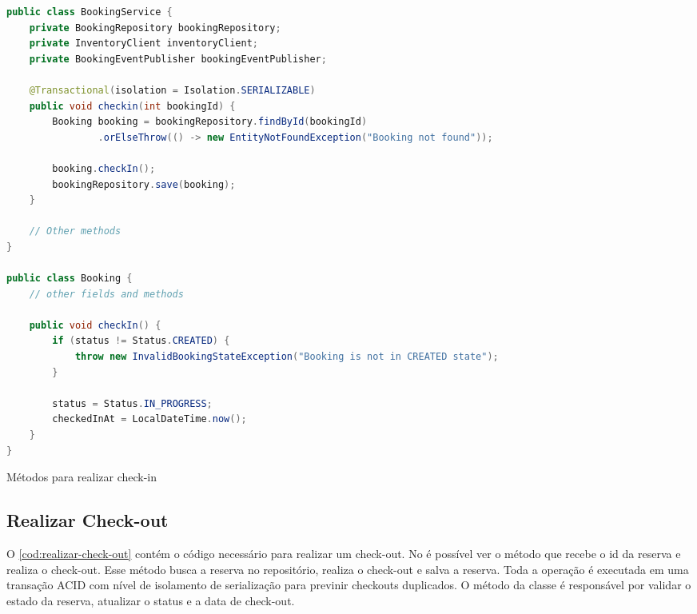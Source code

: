 \begin{codigo}[H]
    \begin{lstlisting}[language=Java]
public class BookingService {
    private BookingRepository bookingRepository;
    private InventoryClient inventoryClient;
    private BookingEventPublisher bookingEventPublisher;

    @Transactional(isolation = Isolation.SERIALIZABLE)
    public void checkin(int bookingId) {
        Booking booking = bookingRepository.findById(bookingId)
                .orElseThrow(() -> new EntityNotFoundException("Booking not found"));

        booking.checkIn();
        bookingRepository.save(booking);
    }

    // Other methods
}

public class Booking {
    // other fields and methods

    public void checkIn() {
        if (status != Status.CREATED) {
            throw new InvalidBookingStateException("Booking is not in CREATED state");
        }

        status = Status.IN_PROGRESS;
        checkedInAt = LocalDateTime.now();
    }
}
    \end{lstlisting}
    \caption{Métodos para realizar check-in}
    \label{cod:realizar-check-in}
\end{codigo}

\subsection{Realizar Check-out}
O \autoref{cod:realizar-check-out} contém o código necessário para realizar um check-out. No  é possível ver o método  que recebe o id da reserva e realiza o check-out. Esse método busca a reserva no repositório, realiza o check-out e salva a reserva. Toda a operação é executada em uma transação ACID com nível de isolamento de serialização para previnir checkouts duplicados. O método  da classe  é responsável por validar o estado da reserva, atualizar o status e a data de check-out.

